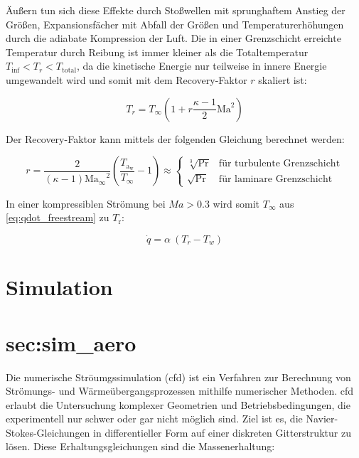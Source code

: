 Äußern tun sich diese Effekte durch Stoßwellen mit sprunghaftem Anstieg der Größen, Expansionsfächer mit Abfall der Größen und
Temperaturerhöhungen durch die adiabate Kompression der Luft. Die in einer Grenzschicht erreichte Temperatur durch Reibung
ist immer kleiner als die Totaltemperatur $T_{\inf} < T_r < T_\mathrm{total}$, da die kinetische Energie nur teilweise in innere Energie
umgewandelt wird und somit mit dem Recovery-Faktor $r$ skaliert ist:

\begin{equation}
  \label{eq:recovery_temperatur}
  T_r = T_{\infty} \left( 1 + r \frac{\kappa - 1}{2} \text{Ma}^2 \right)
\end{equation}

Der Recovery-Faktor kann mittels der folgenden Gleichung berechnet werden:

\begin{equation}
  \label{eq:recovery_faktor}
  r = \frac{2}{\left( \kappa - 1 \right) \mathrm{Ma_{\infty}}^2} \left( \frac{T_\mathrm{a_{w}}}{T_{\infty}} - 1 \right) \approx
  \begin{cases}
    \sqrt[3]{\text{Pr}} & \text{für turbulente Grenzschicht}\\
    \sqrt{\text{Pr}} & \text{für laminare Grenzschicht}
  \end{cases}
\end{equation}

In einer kompressiblen Strömung bei $Ma > 0.3$ wird somit $T_{\infty}$ aus \ref{eq:qdot_freestream} zu $T_\text{r}$:

\begin{equation}
  \label{eq:qdot_recovery}
  \dot{q} = \alpha \ (T_r - T_w)
\end{equation}

\section{Simulation}
\section*{sec:sim_aero}

Die numerische Ströumgssimulation (\ac{cfd}) ist ein Verfahren zur Berechnung von Strömungs- und Wärmeübergangsprozessen
mithilfe numerischer Methoden. \ac{cfd} erlaubt die Untersuchung komplexer Geometrien und Betriebsbedingungen,
die experimentell nur schwer oder gar nicht möglich sind. Ziel ist es, die Navier-Stokes-Gleichungen in differentieller Form auf einer
diskreten Gitterstruktur zu lösen. Diese Erhaltungsgleichungen sind die Massenerhaltung:

